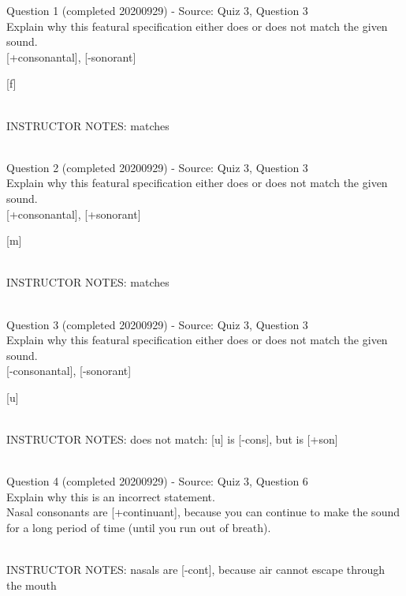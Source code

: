 \documentclass[12pt]{article}
\begin{document}
{\large Question 1} (completed 20200929) - Source: Quiz 3, Question 3\\

Explain why this featural specification either does or does not match the given sound.\\

{[+consonantal]}, {[-sonorant]}

{[f]}


~\\
INSTRUCTOR NOTES: matches


~\\

{\large Question 2} (completed 20200929) - Source: Quiz 3, Question 3\\

Explain why this featural specification either does or does not match the given sound.\\

{[+consonantal]}, {[+sonorant]}

{[m]}


~\\
INSTRUCTOR NOTES: matches


~\\

{\large Question 3} (completed 20200929) - Source: Quiz 3, Question 3\\

Explain why this featural specification either does or does not match the given sound.\\

{[-consonantal]}, {[-sonorant]}

{[u]}


~\\
INSTRUCTOR NOTES: does not match: [u] is [-cons], but is [+son]


~\\

{\large Question 4} (completed 20200929) - Source: Quiz 3, Question 6\\

Explain why this is an incorrect statement.\\

Nasal consonants are {[+continuant]}, because you can continue to make the sound for a long period of time (until you run out of breath).


~\\
INSTRUCTOR NOTES: nasals are [-cont], because air cannot escape through the mouth


~\\
\end{document}
